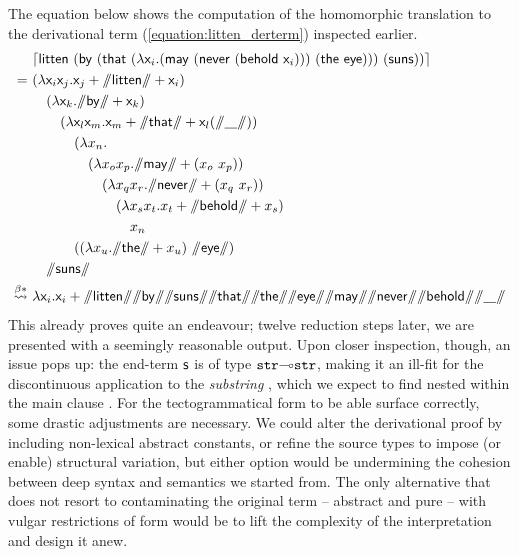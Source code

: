 The equation below shows the computation of the homomorphic translation to the derivational term (\ref{equation:litten_derterm}) inspected earlier.
{\smaller
\begin{equation}\label{equation:acg_pheno}
	\begin{aligned}
	& 			\hm{\term{litten~(by~(that~(\lam \vari .(may~(never~(behold~\vari )))~(the~eye)))~(suns))}} \\
	= \ 
	&							(\lam \vari\varj.\varj + \str{litten}+ \vari) \\
	&\quad								(\lam \vark.\str{by}+ \vark)\\
	&\qquad									(\lam \varl\varm. \varm + \str{that} + \varl(\str{\gap}))\\
	&\qqquad								(\lam x_n. \\
	&\qqquad\quad										(\lam x_o x_p.\str{may}+(x_o ~x_p))\\
	&\qqquad\qquad											(\lam x_q x_r.\str{never}+(x_q~x_r))\\
	&\qqquad\qqquad												(\lam x_sx_t.x_t+\str{behold}+x_s)\\
	&\qqquad\qqqquad												x_n \\
	&\qqquad												((\lam x_u.\str{the}+x_u)~\str{eye})\\
	&\quad									\str{suns}\\
	\bredstar \ & \term{\lam \vari.\vari + \str{litten}\str{by}\str{suns}\str{that}\str{the}\str{eye}\str{may}\str{never}\str{behold}}\str{\gap}
	\end{aligned}
\end{equation}
}%
This already proves quite an endeavour; twelve reduction steps later, we are presented with a seemingly reasonable output.
Upon closer inspection, though, an issue pops up: the end-term $\mathsf{s}$ is of type $\mathtt{str}\li\mathtt{str}$, making it an ill-fit for the discontinuous application to the \textit{substring} , which we expect to find nested within the main clause .
For the tectogrammatical form to be able surface correctly, some drastic adjustments are necessary.
We could alter the derivational proof by including non-lexical abstract constants, or refine the source types to impose (or enable) structural variation, but either option would be undermining the cohesion between deep syntax and semantics we started from.
The only alternative that does not resort to contaminating the original term -- abstract and pure -- with vulgar restrictions of form would be to lift the complexity of the interpretation and design it anew.

